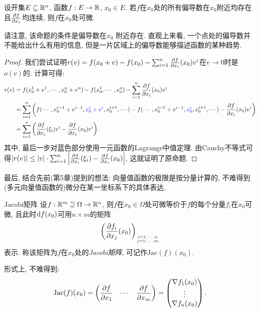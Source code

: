 \begin{proposition}{}
	设开集$E \subseteq \mathbb{R} ^n$, 函数$f: E \to \mathbb{R}$, $x_0 \in E$. 若$f$在$x_0$处的所有偏导数在$x_0$附近均存在且$\frac{\partial f}{\partial x_i}$均连续, 则$f$在$x_0$处可微. 
\end{proposition}
\begin{remark}
	请注意, 该命题的条件是偏导数在$x_0${\color{blue} 附近}存在. 直观上来看, 一个点处的偏导数并不能给出什么有用的信息, 但是一片区域上的偏导数能够描述函数的某种趋势. 
\end{remark}
\begin{proof}
	我们尝试证明$r(v)=f(x_0+v)-f(x_0)-\sum_{i=1}^{n} \frac{\partial f}{\partial x_i}(x_0)v^i$在$v \to 0$时是$o(v)$的. 计算可得: 
	\begin{align*}
		r(v) &= f(x_0^1+v^1,\cdots ,x_0^n+v^n) - f(x_0^1,\cdots ,x_0^n) - \sum_{i=1}^{n} \frac{\partial f}{\partial x_i}(x_0)v^i \\
		&= \sum_{i=1}^{n} \left( f(\cdots ,x_0^{i-1}+v^{i-1},{\color{blue} x_0^{i}+v^{i} },x_0^{i+1},\cdots) - f(\cdots ,x_0^{i-1}+v^{i-1},{\color{blue}x_0^{i} },x_0^{i+1},\cdots) - \frac{\partial f}{\partial x_i}(x_0)v^i \right) \\
		&= \sum_{i=1}^{n} \left( \frac{\partial f}{\partial x_i}(\xi _i)v^i - \frac{\partial f}{\partial x_i}(x_0)v^i \right). 
	\end{align*}
	其中, 最后一步对蓝色部分使用一元函数的Lagrange中值定理. 由Cauchy不等式可得$|r(v)| \leq |v| \cdot \sum_{i=1}^{n}\left| \frac{\partial f}{\partial x_i}(\xi _i) - \frac{\partial f}{\partial x_i}(x_0) \right|$, 这就证明了原命题. 
\end{proof}

最后, 结合先前(第5章)提到的想法: 向量值函数的极限是按分量计算的, 不难得到(多元向量值函数的)微分在某一坐标系下的具体表达. 

\begin{proposition}{Jacobi矩阵}
	设$f:\mathbb{R} ^m \supseteq \Omega \to \mathbb{R} ^n$, 则$f$在$x_0 \in \Omega$处可微等价于$f$的每个分量$f_i$在$x_0$可微, 且此时$\mathop{}\!\mathrm{d} f (x_0)$可用$n \times m$的矩阵$$\left( \frac{\partial f_i}{\partial x_j}(x_0) \right)_{i=1,\cdots ,n \atop j=1,\cdots ,m}$$
	表示. 称该矩阵为$f$在$x_0$处的\textit{Jacobi矩阵}, 可记作$\mathrm{Jac} (f)(x_0)$. 
\end{proposition}

形式上, 不难得到: $$\mathrm{Jac}(f)(x_0) = \begin{pmatrix}
	\dfrac{\partial f}{\partial x_1} & \cdots & \dfrac{\partial f}{\partial x_m}
\end{pmatrix} = \begin{pmatrix}
	\nabla f_1(x_0) \\ \vdots \\ \nabla f_n(x_0)
\end{pmatrix}.$$

